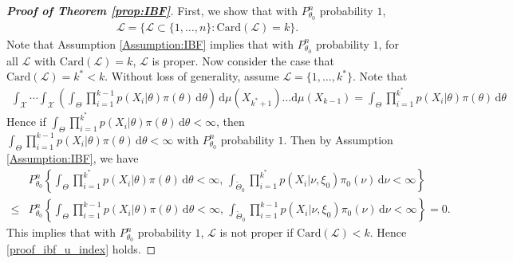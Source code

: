 \documentclass[11pt]{article}
\theoremstyle{plain}
\theoremstyle{definition}
\theoremstyle{remark}
\begin{document}
\begin{appendices}
\begin{proof} [\textbf{Proof of Theorem \ref{prop:IBF}}]
    First, we show that with $P_{\theta_0}^n$ probability $1$,
    \begin{align}\label{proof_ibf_u_index}
        \mathscr L = \{\mathcal L \subset \{1,\dots,n\}: \text{Card}(\mathcal L) = k \}.
    \end{align}
    Note that Assumption \ref{Assumption:IBF} implies that with $P_{\theta_0}^n$ probability $1$, for all $\mathcal L$ with $\text{Card}(\mathcal L) = k$, $\mathcal L$ is proper.
    Now consider the case that $\text{Card} (\mathcal L ) = k^* < k$.
    Without loss of generality, assume $\mathcal L = \{1, \dots, k^*\}$.
    Note that
    \begin{align*}
        \int_{\mathcal X}
        \cdots
        \int_{\mathcal X}
        \left(
    \int_{\Theta} \prod_{i=1}^{k-1} p (X_i| \theta) \pi(\theta) \, \mathrm d \theta  
        \right)
        \, \mathrm d \mu (X_{{k^* + 1}})
        \ldots \mathrm d \mu (X_{{k- 1}})
=
    \int_{\Theta} \prod_{i=1}^{k^*} p (X_i| \theta) \pi(\theta) \, \mathrm d \theta  
    \end{align*}
    Hence if $
    \int_{\Theta} \prod_{i=1}^{k^*} p (X_i| \theta) \pi(\theta) \, \mathrm d \theta  
    < \infty
    $, then
    $
    \int_{\Theta} \prod_{i=1}^{k-1} p (X_i| \theta) \pi(\theta) \, \mathrm d \theta  
    < \infty
    $
    with $P_{\theta_0}^n$ probability $1$.
    Then by Assumption \ref{Assumption:IBF}, we have
\begin{align*}
&
P_{\theta_0}^n 
\left\{
    \int_{\Theta} \prod_{i=1}^{k^*} p (X_i| \theta) \pi(\theta) \, \mathrm d \theta  < \infty
,\,
    \int_{\tilde \Theta_0} \prod_{i=1}^{k^*} p (X_i| \nu, \xi_0) \pi_0(\nu) \, \mathrm d \nu  < \infty
\right\} 
\\
\leq
&
P_{\theta_0}^n 
\left\{
    \int_{\Theta} \prod_{i=1}^{k-1} p (X_i| \theta) \pi(\theta) \, \mathrm d \theta  < \infty
,\,
    \int_{\tilde \Theta_0} \prod_{i=1}^{k-1} p (X_i| \nu, \xi_0) \pi_0(\nu) \, \mathrm d \nu  < \infty
\right\} = 0.
\end{align*}
This implies that with $P_{\theta_0}^n$ probability $1$, $\mathcal L$ is not proper if $\text{Card}(\mathcal L) < k$.
Hence \eqref{proof_ibf_u_index} holds.


\end{proof}
\end{appendices}
\end{document}
